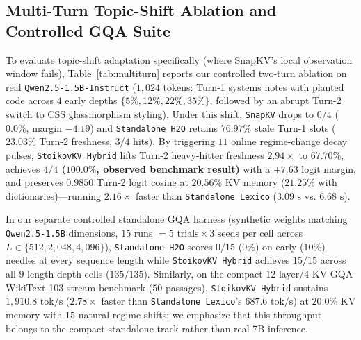 \documentclass[conference]{IEEEtran}
\begin{document}
\subsection{Multi-Turn Topic-Shift Ablation and Controlled GQA Suite}
To evaluate topic-shift adaptation specifically (where SnapKV's local observation window fails), Table~\ref{tab:multiturn} reports our controlled two-turn ablation on real \texttt{Qwen2.5-1.5B-Instruct} ($1{,}024$ tokens: Turn-1 systems notes with planted code across $4$ early depths $\{5\%, 12\%, 22\%, 35\%\}$, followed by an abrupt Turn-2 switch to CSS glassmorphism styling). Under this shift, \texttt{SnapKV} drops to $0/4$ ($0.0\%$, margin $-4.19$) and \texttt{Standalone H2O} retains $76.97\%$ stale Turn-1 slots ($23.03\%$ Turn-2 freshness, $3/4$ hits). By triggering $11$ online regime-change decay pulses, \texttt{StoikovKV Hybrid} lifts Turn-2 heavy-hitter freshness $2.94\times$ to \textbf{$67.70\%$}, achieves \textbf{$4/4$ ($100.0\%$, observed benchmark result)} with a $+7.63$ logit margin, and preserves $0.9850$ Turn-2 logit cosine at $20.56\%$ KV memory ($21.25\%$ with dictionaries)---running $2.16\times$ faster than \texttt{Standalone Lexico} ($3.09\text{ s}$ vs. $6.68\text{ s}$).

In our separate controlled standalone GQA harness (synthetic weights matching \texttt{Qwen2.5-1.5B} dimensions, $15$ runs $= 5\text{ trials} \times 3\text{ seeds}$ per cell across $L \in \{512, 2{,}048, 4{,}096\}$), \texttt{Standalone H2O} scores $0/15$ ($0\%$) on early ($10\%$) needles at every sequence length while \texttt{StoikovKV Hybrid} achieves $15/15$ across all $9$ length-depth cells ($135/135$). Similarly, on the compact $12$-layer/$4$-KV GQA WikiText-103 stream benchmark ($50$ passages), \texttt{StoikovKV Hybrid} sustains $1{,}910.8\text{ tok/s}$ ($2.78\times$ faster than \texttt{Standalone Lexico}'s $687.6\text{ tok/s}$) at $20.0\%$ KV memory with $15$ natural regime shifts; we emphasize that this throughput belongs to the compact standalone track rather than real 7B inference.
\end{document}
